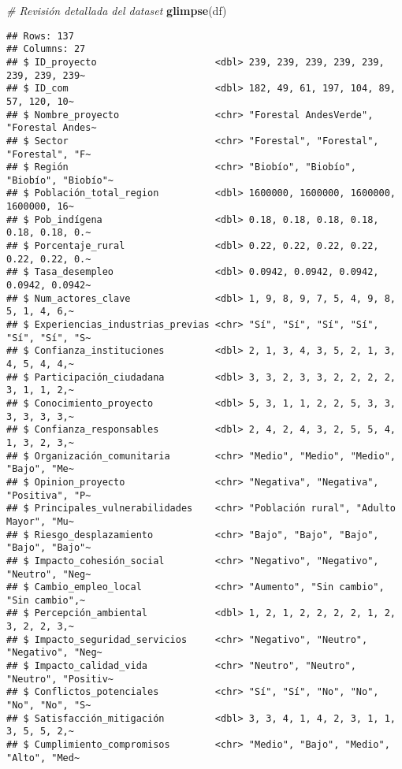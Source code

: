 \documentclass[
]{article}
\newenvironment{Shaded}{\begin{snugshade}}{\end{snugshade}}
\newcommand{\CommentTok}[1]{\textcolor[rgb]{0.56,0.35,0.01}{\textit{#1}}}
\newcommand{\FunctionTok}[1]{\textcolor[rgb]{0.13,0.29,0.53}{\textbf{#1}}}
\newcommand{\NormalTok}[1]{#1}
\begin{document}
\begin{Shaded}
\begin{Highlighting}[]
\CommentTok{\# Revisión detallada del dataset}
\FunctionTok{glimpse}\NormalTok{(df)}
\end{Highlighting}
\end{Shaded}

\begin{verbatim}
## Rows: 137
## Columns: 27
## $ ID_proyecto                     <dbl> 239, 239, 239, 239, 239, 239, 239, 239~
## $ ID_com                          <dbl> 182, 49, 61, 197, 104, 89, 57, 120, 10~
## $ Nombre_proyecto                 <chr> "Forestal AndesVerde", "Forestal Andes~
## $ Sector                          <chr> "Forestal", "Forestal", "Forestal", "F~
## $ Región                          <chr> "Biobío", "Biobío", "Biobío", "Biobío"~
## $ Población_total_region          <dbl> 1600000, 1600000, 1600000, 1600000, 16~
## $ Pob_indígena                    <dbl> 0.18, 0.18, 0.18, 0.18, 0.18, 0.18, 0.~
## $ Porcentaje_rural                <dbl> 0.22, 0.22, 0.22, 0.22, 0.22, 0.22, 0.~
## $ Tasa_desempleo                  <dbl> 0.0942, 0.0942, 0.0942, 0.0942, 0.0942~
## $ Num_actores_clave               <dbl> 1, 9, 8, 9, 7, 5, 4, 9, 8, 5, 1, 4, 6,~
## $ Experiencias_industrias_previas <chr> "Sí", "Sí", "Sí", "Sí", "Sí", "Sí", "S~
## $ Confianza_instituciones         <dbl> 2, 1, 3, 4, 3, 5, 2, 1, 3, 4, 5, 4, 4,~
## $ Participación_ciudadana         <dbl> 3, 3, 2, 3, 3, 2, 2, 2, 2, 3, 1, 1, 2,~
## $ Conocimiento_proyecto           <dbl> 5, 3, 1, 1, 2, 2, 5, 3, 3, 3, 3, 3, 3,~
## $ Confianza_responsables          <dbl> 2, 4, 2, 4, 3, 2, 5, 5, 4, 1, 3, 2, 3,~
## $ Organización_comunitaria        <chr> "Medio", "Medio", "Medio", "Bajo", "Me~
## $ Opinion_proyecto                <chr> "Negativa", "Negativa", "Positiva", "P~
## $ Principales_vulnerabilidades    <chr> "Población rural", "Adulto Mayor", "Mu~
## $ Riesgo_desplazamiento           <chr> "Bajo", "Bajo", "Bajo", "Bajo", "Bajo"~
## $ Impacto_cohesión_social         <chr> "Negativo", "Negativo", "Neutro", "Neg~
## $ Cambio_empleo_local             <chr> "Aumento", "Sin cambio", "Sin cambio",~
## $ Percepción_ambiental            <dbl> 1, 2, 1, 2, 2, 2, 2, 1, 2, 3, 2, 2, 3,~
## $ Impacto_seguridad_servicios     <chr> "Negativo", "Neutro", "Negativo", "Neg~
## $ Impacto_calidad_vida            <chr> "Neutro", "Neutro", "Neutro", "Positiv~
## $ Conflictos_potenciales          <chr> "Sí", "Sí", "No", "No", "No", "No", "S~
## $ Satisfacción_mitigación         <dbl> 3, 3, 4, 1, 4, 2, 3, 1, 1, 3, 5, 5, 2,~
## $ Cumplimiento_compromisos        <chr> "Medio", "Bajo", "Medio", "Alto", "Med~
\end{verbatim}
\end{document}

